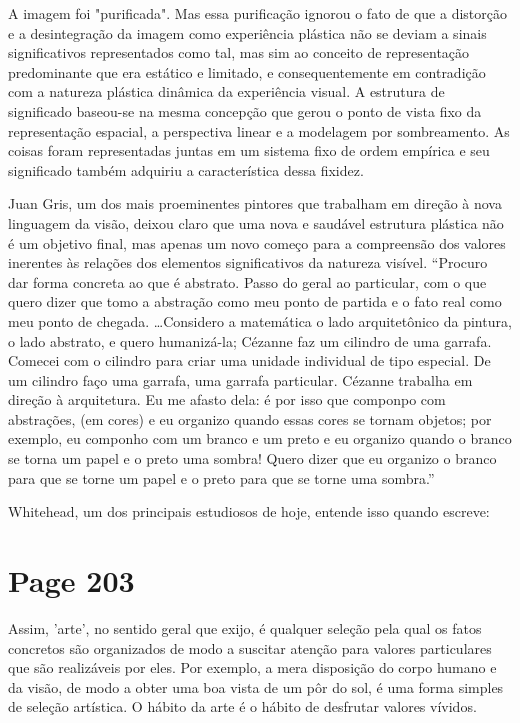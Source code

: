 \documentclass[a4paper]{article}
\begin{document}
A imagem foi "purificada". Mas essa purificação ignorou o fato de que a distorção e a desintegração da imagem como experiência plástica não se deviam a sinais significativos representados como tal, mas sim ao conceito de representação predominante que era estático e limitado, e consequentemente em contradição com a natureza plástica dinâmica da experiência visual. A estrutura de significado baseou-se na mesma concepção que gerou o ponto de vista fixo da representação espacial, a perspectiva linear e a modelagem por sombreamento. As coisas foram representadas juntas em um sistema fixo de ordem empírica e seu significado também adquiriu a característica dessa fixidez.

Juan Gris, um dos mais proeminentes pintores que trabalham em direção à nova linguagem da visão, deixou claro que uma nova e saudável estrutura plástica não é um objetivo final, mas apenas um novo começo para a compreensão dos valores inerentes às relações dos elementos significativos da natureza visível. ``Procuro dar forma concreta ao que é abstrato. Passo do geral ao particular, com o que quero dizer que tomo a abstração como meu ponto de partida e o fato real como meu ponto de chegada. \ldots Considero a matemática o lado arquitetônico da pintura, o lado abstrato, e quero humanizá-la; Cézanne faz um cilindro de uma garrafa. Comecei com o cilindro para criar uma unidade individual de tipo especial. De um cilindro faço uma garrafa, uma garrafa particular. Cézanne trabalha em direção à arquitetura. Eu me afasto dela: é por isso que componpo com abstrações, (em cores) e eu organizo quando essas cores se tornam objetos; por exemplo, eu componho com um branco e um preto e eu organizo quando o branco se torna um papel e o preto uma sombra! Quero dizer que eu organizo o branco para que se torne um papel e o preto para que se torne uma sombra.''

Whitehead, um dos principais estudiosos de hoje, entende isso quando escreve:

\vfill
{}

\newpage
\section*{Page 203}

Assim, 'arte', no sentido geral que exijo, é qualquer seleção pela qual os fatos concretos são organizados de modo a suscitar atenção para valores particulares que são realizáveis por eles. Por exemplo, a mera disposição do corpo humano e da visão, de modo a obter uma boa vista de um pôr do sol, é uma forma simples de seleção artística. O hábito da arte é o hábito de desfrutar valores vívidos.
\end{document}
